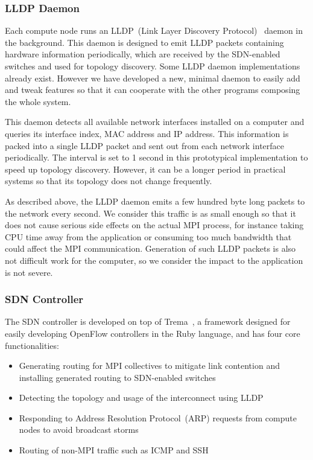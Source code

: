 \subsubsection{LLDP Daemon}

Each compute node runs an LLDP~(Link Layer Discovery
Protocol)~\autocite{lldp} daemon in the background. This daemon is designed to
emit LLDP packets containing hardware information periodically, which are
received by the SDN-enabled switches and used for topology discovery. Some
LLDP daemon implementations already exist. However we have developed a new,
minimal daemon to easily add and tweak features so that it can cooperate with
the other programs composing the whole system.

This daemon detects all available network interfaces installed on a
computer and queries its interface index, MAC address and IP address.
This information is packed into a single LLDP packet and sent out from
each network interface periodically. The interval is set to 1 second in
this prototypical implementation to speed up topology discovery.
However, it can be a longer period in practical systems so that its
topology does not change frequently.

As described above, the LLDP daemon emits a few hundred byte long
packets to the network every second. We consider this traffic is as
small enough so that it does not cause serious side effects on the
actual MPI process, for instance taking CPU time away from the
application or consuming too much bandwidth that could affect the MPI
communication. Generation of such LLDP packets is also not difficult
work for the computer, so we consider the impact to the application is
not severe.

\subsubsection{SDN Controller}

The SDN controller is developed on top  of Trema~\autocite{trema}, a framework
designed for easily developing OpenFlow controllers in the Ruby language, and
has four core functionalities:

\begin{itemize}
\item Generating routing for MPI collectives to mitigate link contention and
    installing generated routing to SDN-enabled switches
\item Detecting the topology and usage of the interconnect using LLDP
\item Responding to Address Resolution Protocol~(ARP) requests from compute
    nodes to avoid broadcast storms
\item Routing of non-MPI traffic such as ICMP and SSH
\end{itemize}

